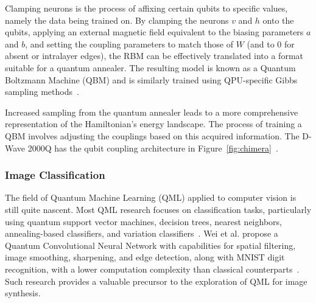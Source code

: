 \documentclass[technologies,article,accept,pdftex,moreauthors]{Definitions/mdpi}
\newcommand{\figref}[1]{Figure~\ref{#1}}
\begin{document}
Clamping neurons is the process of affixing certain qubits to specific values, namely the data being trained on. By clamping the neurons $v$ and $h$ onto the qubits, applying an external magnetic field equivalent to the biasing parameters $a$ and $b$, and setting the coupling parameters to match those of $W$ (and to 0 for absent or intralayer edges), the RBM can be effectively translated into a format suitable for a quantum annealer. The resulting model is known as a Quantum Boltzmann Machine (QBM) and is similarly trained using QPU-specific Gibbs sampling methods~\cite{dwavedocs,qpugibbs}.



Increased sampling from the quantum annealer leads to a more comprehensive representation of the Hamiltonian's energy landscape. The process of training a QBM involves adjusting the couplings based on this acquired information. The D-Wave 2000Q has the qubit coupling architecture in \figref{fig:chimera}~\cite{dwavedocs}.

\subsubsection{Image Classification}
The field of Quantum Machine Learning (QML) applied to computer vision is still quite nascent. Most QML research focuses on classification tasks, particularly using quantum support vector machines, decision trees, nearest neighbors, annealing-based classifiers, and variation classifiers~\cite{classifiers}.  Wei et al. propose a Quantum Convolutional Neural Network with capabilities for spatial filtering, image smoothing, sharpening, and edge detection, along with MNIST digit recognition, with a lower computation complexity than classical counterparts~\cite{quantumCNN}. Such research provides a valuable precursor to the exploration of QML for image synthesis.
\end{document}
